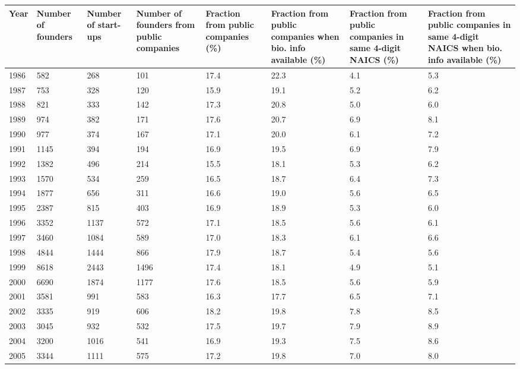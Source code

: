 \begin{table}[!htb]
\centering
\begingroup\scriptsize
\begin{tabular}{p{1.75cm}p{1.75cm}p{1.75cm}p{1.75cm}p{1.75cm}p{1.75cm}p{1.75cm}p{1.75cm}}
  \toprule
Year & Number of founders & Number of start-ups & Number of founders from public companies & Fraction from public companies (\%) & Fraction from public companies when bio. info available (\%) & Fraction from public companies in same 4-digit NAICS (\%) & Fraction from public companies in same 4-digit NAICS when bio. info available (\%) \\ 
  \midrule
1986 & 582 & 268 & 101 & 17.4 & 22.3 & 4.1 & 5.3 \\ 
  1987 & 753 & 328 & 120 & 15.9 & 19.1 & 5.2 & 6.2 \\ 
  1988 & 821 & 333 & 142 & 17.3 & 20.8 & 5.0 & 6.0 \\ 
  1989 & 974 & 382 & 171 & 17.6 & 20.7 & 6.9 & 8.1 \\ 
  1990 & 977 & 374 & 167 & 17.1 & 20.0 & 6.1 & 7.2 \\ 
  1991 & 1145 & 394 & 194 & 16.9 & 19.5 & 6.9 & 7.9 \\ 
  1992 & 1382 & 496 & 214 & 15.5 & 18.1 & 5.3 & 6.2 \\ 
  1993 & 1570 & 534 & 259 & 16.5 & 18.7 & 6.4 & 7.3 \\ 
  1994 & 1877 & 656 & 311 & 16.6 & 19.0 & 5.6 & 6.5 \\ 
  1995 & 2387 & 815 & 403 & 16.9 & 18.9 & 5.3 & 6.0 \\ 
  1996 & 3352 & 1137 & 572 & 17.1 & 18.5 & 5.6 & 6.1 \\ 
  1997 & 3460 & 1084 & 589 & 17.0 & 18.3 & 6.1 & 6.6 \\ 
  1998 & 4844 & 1444 & 866 & 17.9 & 18.7 & 5.4 & 5.6 \\ 
  1999 & 8618 & 2443 & 1496 & 17.4 & 18.1 & 4.9 & 5.1 \\ 
  2000 & 6690 & 1874 & 1177 & 17.6 & 18.5 & 5.6 & 5.9 \\ 
  2001 & 3581 & 991 & 583 & 16.3 & 17.7 & 6.5 & 7.1 \\ 
  2002 & 3335 & 919 & 606 & 18.2 & 19.8 & 7.8 & 8.5 \\ 
  2003 & 3045 & 932 & 532 & 17.5 & 19.7 & 7.9 & 8.9 \\ 
  2004 & 3200 & 1016 & 541 & 16.9 & 19.3 & 7.5 & 8.6 \\ 
  2005 & 3344 & 1111 & 575 & 17.2 & 19.8 & 7.0 & 8.0 \\ 

\end{tabular}
\end{table}

